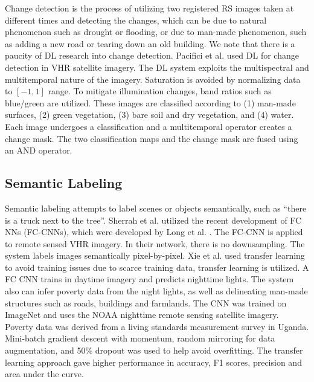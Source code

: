 \documentclass[12pt]{spieman}
\begin{document}
\begin{spacing}{1}
Change detection is the process of utilizing two registered RS images taken at different times and detecting the changes, which can be due to natural phenomenon such as drought or flooding, or due to man-made phenomenon, such as adding a new road or tearing down an old building. We note that there is a paucity of DL research into change detection. Pacifici et al. \cite{Pacifici2007} used DL for change detection in VHR satellite imagery. The DL system exploits the multispectral and multitemporal nature of the imagery. Saturation is avoided by normalizing data to $[-1,1]$ range. To mitigate illumination changes, band ratios such as blue/green are utilized. These images are classified according to (1) man-made surfaces, (2) green vegetation, (3) bare soil and dry vegetation, and (4) water. Each image undergoes a classification and a multitemporal operator creates a change mask. The two classification maps and the change mask are fused using an AND operator.

\subsection{Semantic Labeling}

Semantic labeling attempts to label scenes or objects semantically, such as ``there is a truck next to the tree''. Sherrah et al. \cite{sherrah2016fully} utilized the recent development of FC NNs (FC-CNNs), which were developed by Long et al. \cite{long2015fully}. The FC-CNN is applied to remote sensed VHR imagery. In their network, there is no downsampling. The system labels images semantically pixel-by-pixel. Xie et al. \cite{xie2015transfer} used transfer learning to avoid training issues due to scarce training data, transfer learning is utilized. A FC CNN trains in daytime imagery and predicts nighttime lights. The system also can infer poverty data from the night lights, as well as delineating man-made structures such as roads, buildings and farmlands. The CNN was trained on ImageNet and uses the NOAA nighttime remote sensing satellite imagery. Poverty data was derived from a living standards measurement survey in Uganda. Mini-batch gradient descent with momentum, random mirroring for data augmentation, and 50\% dropout was used to help avoid overfitting. The transfer learning approach gave higher performance in accuracy, F1 scores, precision and area under the curve.


\end{spacing}
\end{document}
